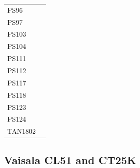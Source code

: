 \documentclass[12pt,a4paper]{article}
\begin{document}
\begin{table}[t!]
\begin{tabular}{lp{14.5cm}}
PS96     & \cite{kniglanglo2016b,kniglanglo2016c,kniglanglo2016d,kniglanglo2016e,schrder2017} \\
PS97     & \cite{kniglanglo2016f,kniglanglo2016g,kniglanglo2016h,kniglanglo2016i,lamy2017} \\
PS103    & \cite{kniglanglo2017a,kniglanglo2017b,kniglanglo2017c,kniglanglo2017d,boebel2018} \\
PS104    & \cite{kniglanglo2017e,kniglanglo2017f,kniglanglo2017g,gohl2018,schmithsen2021a} \\
PS111    & \cite{schmithsen2019a,schmithsen2020a,schmithsen2021b,schmithsen2021c,schrder2018} \\
PS112    & \cite{schmithsen2019b,schmithsen2020b,schmithsen2021d,schmithsen2021e,meyer2018} \\
PS117    & \cite{schmithsen2019c,schmithsen2020c,schmithsen2021f,schmithsen2021g,boebel2019} \\
PS118    & \cite{schmithsen2019d,schmithsen2020d,schmithsen2021h,schmithsen2021i,dorschel2019} \\
PS123    & \cite{schmithsen2021j,schmithsen2021m,schmithsen2021n,schmithsen2021k,hoppmann2023} \\
PS124    & \cite{schmithsen2021o,schmithsen2021q,schmithsen2021p,hoppmann2023} \\
TAN1802  & \cite{kremser2020,kremser2021} \\
\end{tabular}
\end{table}

\subsection{Vaisala CL51 and CT25K}
\label{sec:cl51}
\end{document}
